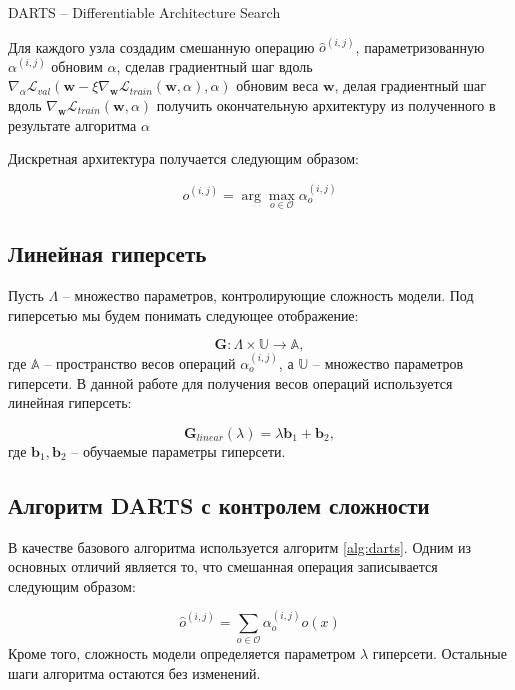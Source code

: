 \documentclass[12pt, twoside]{article}
\begin{document}
\begin{algorithm}[H]
\begin{algorithmic}[1]
\caption{DARTS -- Differentiable Architecture Search}
\label{alg:darts}
\STATE Для каждого узла создадим смешанную операцию $\hat{o}^{(i, j)}$, параметризованную $\alpha^{(i, j)}$
\STATE  обновим $\alpha$, сделав градиентный шаг вдоль $\nabla_\alpha \mathcal{L}_{val}(\mathbf{w} - \xi\nabla_{\mathbf{w}}\mathcal{L}_{train}(\mathbf{w}, \alpha), \alpha)$
\STATE обновим веса $\mathbf{w}$, делая градиентный шаг вдоль $\nabla_\mathbf{w}\mathcal{L}_{train}(\mathbf{w}, \alpha)$
\ENDWHILE
\STATE получить окончательную архитектуру из полученного в результате алгоритма $\alpha$
\end{algorithmic}
\end{algorithm}

Дискретная архитектура получается следующим образом:

$$o^{(i, j)} =\arg\max_{o\in\mathcal{O}}\alpha_o^{(i, j)}$$

\subsection{Линейная гиперсеть}

Пусть $\Lambda$ --  множество параметров, контролирующие сложность модели. Под гиперсетью мы будем понимать следующее отображение:

\begin{equation}
	\mathbf{G} : \Lambda \times \mathbb{U} \rightarrow \mathbb{A},
\end{equation}
где $\mathbb{A}$ -- пространство весов операций $\alpha^{(i, j)}_o$, а $\mathbb{U}$ -- множество параметров гиперсети.
В данной работе для получения весов операций используется линейная гиперсеть:
 
 \begin{equation}
 \mathbf{G}_{linear}(\lambda) = \lambda \mathbf{b}_1 + \mathbf{b}_2,
 \end{equation}
 где $\mathbf{b}_1, \mathbf{b}_2$ -- обучаемые параметры гиперсети.
 
 \subsection{Алгоритм DARTS с контролем сложности}
 
 В качестве базового алгоритма используется алгоритм \ref{alg:darts}. Одним из основных отличий является то, что смешанная операция записывается следующим образом:
 
 $$\hat{o}^{(i, j)} = \sum_{o\in \mathcal{O}}\alpha^{(i, j)}_oo(x)$$
 Кроме того, сложность модели определяется параметром $\lambda$ гиперсети. Остальные шаги алгоритма остаются без изменений.


\end{document}
